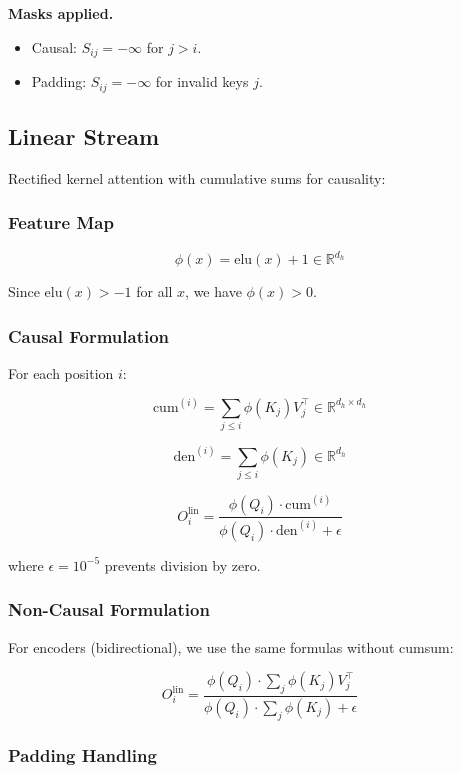 \textbf{Masks applied.}
\begin{itemize}
\item Causal: $S_{ij} = -\infty$ for $j > i$.
\item Padding: $S_{ij} = -\infty$ for invalid keys $j$.

\end{itemize}
\subsection{Linear Stream}

Rectified kernel attention with cumulative sums for causality:

\subsubsection{Feature Map}

\[
\phi(x) = \mathrm{elu}(x) + 1 \in \mathbb{R}^{d_h}
\]

Since $\mathrm{elu}(x) > -1$ for all $x$, we have $\phi(x) > 0$.

\subsubsection{Causal Formulation}

For each position $i$:

\[
\text{cum}^{(i)} = \sum_{j \le i} \phi(K_j) V_j^\top \in \mathbb{R}^{d_h \times d_h}
\]

\[
\text{den}^{(i)} = \sum_{j \le i} \phi(K_j) \in \mathbb{R}^{d_h}
\]

\[
O^\text{lin}_i = \frac{\phi(Q_i) \cdot \text{cum}^{(i)}}{\phi(Q_i) \cdot \text{den}^{(i)} + \epsilon}
\]

where $\epsilon = 10^{-5}$ prevents division by zero.

\subsubsection{Non-Causal Formulation}

For encoders (bidirectional), we use the same formulas without cumsum:

\[
O^\text{lin}_i = \frac{\phi(Q_i) \cdot \sum_j \phi(K_j) V_j^\top}{\phi(Q_i) \cdot \sum_j \phi(K_j) + \epsilon}
\]

\subsubsection{Padding Handling}


